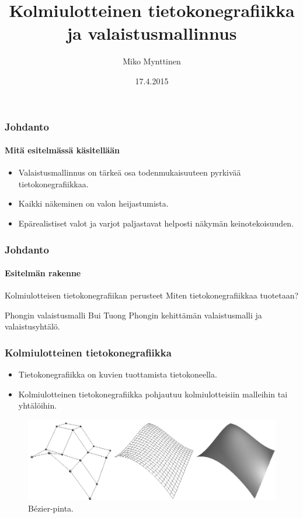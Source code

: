 \documentclass{beamer}
\title{Kolmiulotteinen tietokonegrafiikka ja valaistusmallinnus}
\author{Miko Mynttinen}
\date{17.4.2015}
\institute{
  Tietojenkäsittelytieteen laitos\\
  Helsingin yliopisto
}
\begin{document}
\frame{\titlepage}

\begin{frame}
\frametitle{Johdanto}
\framesubtitle{Mitä esitelmässä käsitellään}
\begin{itemize}
\item Valaistusmallinnus on tärkeä osa todenmukaisuuteen pyrkivää tietokonegrafiikkaa.
\item Kaikki näkeminen on valon heijastumista.
\item Epärealistiset valot ja varjot paljastavat helposti näkymän keinotekoisuuden.
\end{itemize}
\end{frame}

\begin{frame}
\frametitle{Johdanto}
\framesubtitle{Esitelmän rakenne}
\begin{block}{Kolmiulotteisen tietokonegrafiikan perusteet}
Miten tietokonegrafiikkaa tuotetaan?
\end{block}
\begin{block}{Phongin valaistusmalli}
Bui Tuong Phongin kehittämän valaistusmalli ja valaistusyhtälö.
\end{block}
\end{frame}
 
\begin{frame}
\frametitle{Kolmiulotteinen tietokonegrafiikka}
\begin{itemize}
\item Tietokonegrafiikka on kuvien tuottamista tietokoneella.
\item Kolmiulotteinen tietokonegrafiikka pohjautuu kolmiulotteisiin malleihin tai yhtälöihin.
\end{itemize}
\begin{figure}
\includegraphics[scale=0.3]{img/bezier.png}
\caption{Bézier-pinta.~\cite{Moller}}
\end{figure}
\end{frame}
\end{document}
